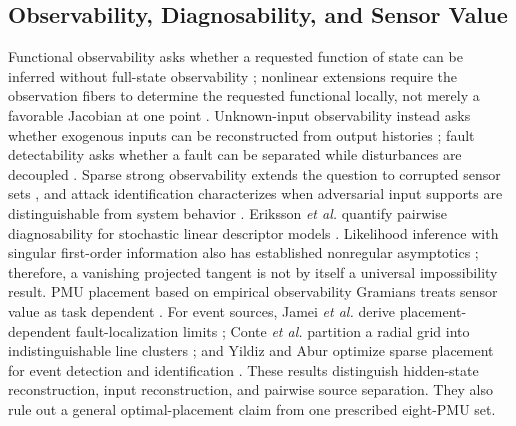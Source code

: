 \subsection{Observability, Diagnosability, and Sensor Value}

Functional observability asks whether a requested function of state can be inferred without full-state observability \cite{fernando2010functional,zhang2025functional}; nonlinear extensions require the observation fibers to determine the requested functional locally, not merely a favorable Jacobian at one point \cite{montanari2022functional}. Unknown-input observability instead asks whether exogenous inputs can be reconstructed from output histories \cite{hou1998input}; fault detectability asks whether a fault can be separated while disturbances are decoupled \cite{nyberg2002detectability}. Sparse strong observability extends the question to corrupted sensor sets \cite{showkatbakhsh2020secure,sun2026secure}, and attack identification characterizes when adversarial input supports are distinguishable from system behavior \cite{pasqualetti2013attack}. Eriksson \emph{et al.} quantify pairwise diagnosability for stochastic linear descriptor models \cite{eriksson2013diagnosability}. Likelihood inference with singular first-order information also has established nonregular asymptotics \cite{rotnitzky2000singular}; therefore, a vanishing projected tangent is not by itself a universal impossibility result. PMU placement based on empirical observability Gramians treats sensor value as task dependent \cite{qi2015placement,sun2016observability}. For event sources, Jamei \emph{et al.} derive placement-dependent fault-localization limits \cite{jamei2020limits}; Conte \emph{et al.} partition a radial grid into indistinguishable line clusters \cite{conte2023fault}; and Yildiz and Abur optimize sparse placement for event detection and identification \cite{yildiz2025sparse}. These results distinguish hidden-state reconstruction, input reconstruction, and pairwise source separation. They also rule out a general optimal-placement claim from one prescribed eight-PMU set.

